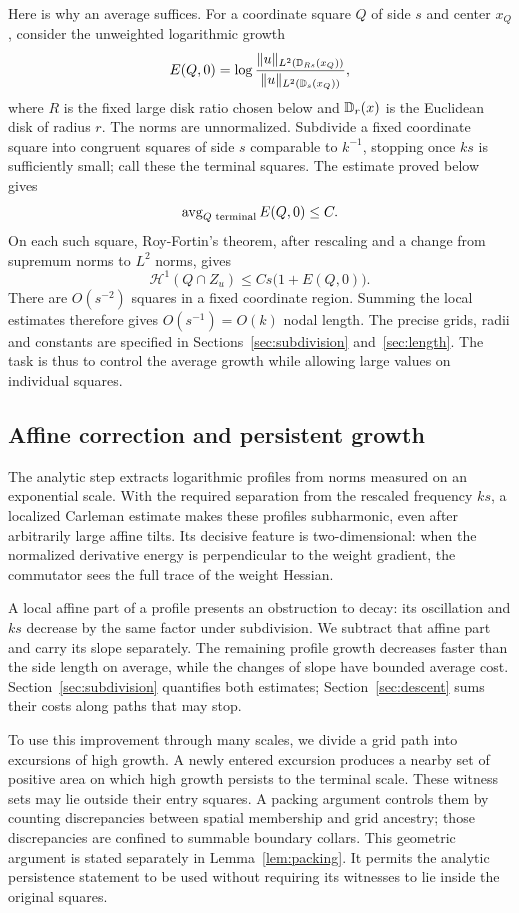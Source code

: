 Here is why an average suffices. For a coordinate square $Q$ of side
$s$ and center $x_Q$, consider the unweighted logarithmic growth
\[
 E(Q,0)=\log
 \frac{\|u\|_{L^2(\mathbb D_{Rs}(x_Q))}}
      {\|u\|_{L^2(\mathbb D_s(x_Q))}},
\]
where $R$ is the fixed large disk ratio chosen below and $\mathbb D_r(x)$ is
the Euclidean disk of radius $r$. The norms are unnormalized.
Subdivide a fixed coordinate square into congruent squares of side
$s$ comparable to $k^{-1}$, stopping once $ks$ is sufficiently small;
call these the terminal squares.
The estimate proved below gives
\[
 \operatorname{avg}_{Q\text{ terminal}} E(Q,0)\le C.
\]
On each such square, Roy-Fortin's theorem, after rescaling and a
change from supremum norms to $L^2$ norms, gives
\[
 \mathcal H^1(Q\cap Z_u)\le Cs\bigl(1+E(Q,0)\bigr).
\]
There are $O(s^{-2})$ squares in a fixed coordinate region.
Summing the local estimates therefore gives $O(s^{-1})=O(k)$
nodal length. The precise grids, radii and constants are specified
in Sections~\ref{sec:subdivision} and~\ref{sec:length}.
The task is thus to control the average growth while allowing large
values on individual squares.

\subsection*{Affine correction and persistent growth}

The analytic step extracts logarithmic profiles from norms measured
on an exponential scale. With the required separation from the rescaled
frequency $ks$, a localized Carleman estimate makes these profiles
subharmonic, even after arbitrarily large affine tilts. Its decisive
feature is two-dimensional: when the normalized derivative energy
is perpendicular to the weight gradient, the commutator sees the
full trace of the weight Hessian.

A local affine part of a profile presents an obstruction to decay:
its oscillation and $ks$ decrease by the same factor
under subdivision. We subtract that affine part and carry its slope
separately. The remaining profile growth decreases faster than the
side length on average, while the changes of slope have bounded
average cost. Section~\ref{sec:subdivision} quantifies both estimates;
Section~\ref{sec:descent} sums their costs along paths that may stop.

To use this improvement through many scales, we divide a grid path
into excursions of high growth. A newly entered excursion produces
a nearby set of positive area on which high growth persists to the
terminal scale. These witness sets may lie outside their entry
squares. A packing argument controls them by counting discrepancies
between spatial membership and grid ancestry; those discrepancies
are confined to summable boundary collars. This geometric argument
is stated separately in Lemma~\ref{lem:packing}. It permits the
analytic persistence statement to be used without requiring its
witnesses to lie inside the original squares.


